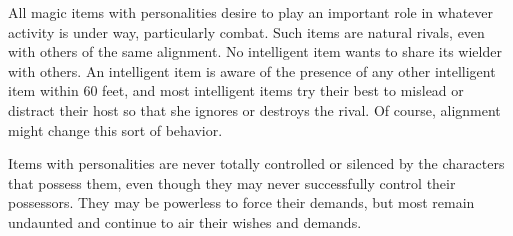 All magic items with personalities desire to play an important role in whatever activity is under way, particularly combat. Such items are natural rivals, even with others of the same alignment. No intelligent item wants to share its wielder with others. An intelligent item is aware of the presence of any other intelligent item within 60 feet, and most intelligent items try their best to mislead or distract their host so that she ignores or destroys the rival. Of course, alignment might change this sort of behavior. 
				
Items with personalities are never totally controlled or silenced by the characters that possess them, even though they may never successfully control their possessors. They may be powerless to force their demands, but most remain undaunted and continue to air their wishes and demands.
        	
